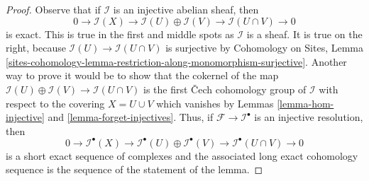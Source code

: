 \documentclass[10pt,a4paper]{amsart}
\theoremstyle{plain}
\theoremstyle{definition}
\theoremstyle{remark}
\numberwithin{equation}{subsection}
\begin{document}
\begin{proof}
Observe that if $\mathcal{I}$ is an injective abelian sheaf, then
$$
0 \to \mathcal{I}(X) \to \mathcal{I}(U) \oplus \mathcal{I}(V) \to
\mathcal{I}(U \cap V) \to 0
$$
is exact. This is true in the first and middle spots as $\mathcal{I}$
is a sheaf. It is true on the right, because
$\mathcal{I}(U) \to \mathcal{I}(U \cap V)$ is surjective by
Cohomology on Sites, Lemma
\ref{sites-cohomology-lemma-restriction-along-monomorphism-surjective}.
Another way to prove it would be to show that the cokernel
of the map $\mathcal{I}(U) \oplus \mathcal{I}(V) \to
\mathcal{I}(U \cap V)$ is the first {\v C}ech cohomology group
of $\mathcal{I}$ with respect to the covering
$X = U \cup V$ which vanishes by
Lemmas \ref{lemma-hom-injective} and \ref{lemma-forget-injectives}.
Thus, if $\mathcal{F} \to \mathcal{I}^\bullet$ is an injective
resolution, then
$$
0 \to \mathcal{I}^\bullet(X) \to
\mathcal{I}^\bullet(U) \oplus \mathcal{I}^\bullet(V) \to
\mathcal{I}^\bullet(U \cap V) \to 0
$$
is a short exact sequence of complexes and the associated long
exact cohomology sequence is the sequence of the statement of the lemma.
\end{proof}
\end{document}
